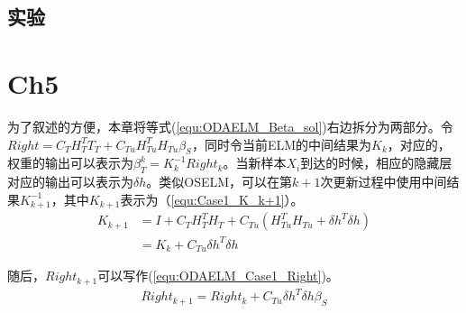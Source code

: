 \subsection{实验}

\section{Ch5}
为了叙述的方便，本章将等式(\ref{equ:ODAELM_Beta_sol})右边拆分为两部分。令$Right=C_T H_T^T T_T + C_{Tu}H_{Tu}^T H_{Tu}\beta_S$，同时令当前ELM的中间结果为$K_{k}$，对应的，权重的输出可以表示为$\beta_{T}^{k}=K_{k}^{-1} Right_{k}$。当新样本$X_{i}$到达的时候，相应的隐藏层对应的输出可以表示为$\delta h$。类似OSELM，可以在第$k+1$次更新过程中使用中间结果$K^{-1}_{k+1}$，其中$K_{k+1}$表示为（\ref{equ:Case1_K_k+1}）。
\begin{equation}
\label{equ:Case1_K_k+1}
\begin{aligned}
K_{k+1} & =I+C_T H_T^T H_T +C_{Tu} (H_{Tu}^T H_{Tu}+ \delta h^T \delta h) \\
& =K_k + C_{Tu}\delta h^T \delta h
\end{aligned}
\end{equation}

随后，$Right_{k+1}$可以写作(\ref{equ:ODAELM_Case1_Right})。
\begin{equation}
\label{equ:ODAELM_Case1_Right}
\begin{aligned}
Right_{k+1}=Right_k + C_{Tu} \delta h^T \delta h \beta_S
\end{aligned}
\end{equation}

